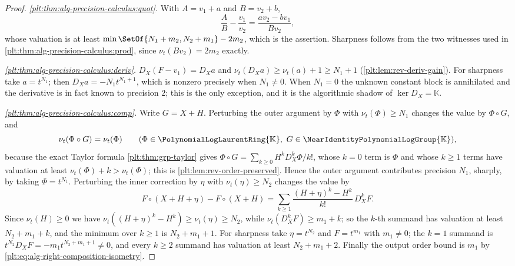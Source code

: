 \documentclass[11pt,oneside]{article}
\theoremstyle{plain}
\theoremstyle{definition}
\theoremstyle{remark}
\newcommand{\K}{\mathbb{K}}
\newcommand{\PLlau}{\PolynomialLogLaurentRing{\K}}       %
\newcommand{\Gnear}{\NearIdentityPolynomialLogGroup{\K}} %
\newcommand{\ordt}{\nu_{t}}                              %
\newcommand{\DX}{D_{X}}                                  %
\newcommand{\compose}{\mathbin{\circ}}
\begin{document}
\begin{proof}
\emph{\ref{plt:thm:alg-precision-calculus:quot}.}
With \(A=v_1+a\) and \(B=v_2+b\),
\[
 \frac AB-\frac{v_1}{v_2}
 =\frac{av_2-bv_1}{Bv_2},
\]
whose valuation is at least
\(\min\SetOf{N_1+m_2,N_2+m_1}-2m_2\), which is the assertion.  Sharpness follows
from the two witnesses used in \ref{plt:thm:alg-precision-calculus:prod},
since \(\ordt(Bv_2)=2m_2\) exactly.

\emph{\ref{plt:thm:alg-precision-calculus:deriv}.}
\(\DX(F-v_1)=\DX a\) and \(\ordt(\DX a)\ge\ordt(a)+1\ge N_1+1\)
(\cref{plt:lem:rev-deriv-gain}).  For sharpness take \(a=t^{N_1}\); then
\(\DX a=-N_1t^{N_1+1}\), which is nonzero precisely when \(N_1\ne0\).  When
\(N_1=0\) the unknown constant block is annihilated and the derivative is in
fact known to precision \(2\); this is the only exception, and it is the
algorithmic shadow of \(\ker\DX=\K\).

\emph{\ref{plt:thm:alg-precision-calculus:comp}.}
Write \(G=X+H\).  Perturbing the outer argument by \(\Phi\) with
\(\ordt(\Phi)\ge N_1\) changes the value by \(\Phi\compose G\), and
\begin{equation}\label{plt:eq:alg-right-composition-isometry}
 \ordt(\Phi\compose G)=\ordt(\Phi)
 \qquad(\Phi\in\PLlau,\ G\in\Gnear),
\end{equation}
because the exact Taylor formula \cref{plt:thm:grp-taylor} gives
\(\Phi\compose G=\sum_{k\ge0}H^k\DX^k\Phi/k!\), whose \(k=0\) term is \(\Phi\)
and whose \(k\ge1\) terms have valuation at least
\(\ordt(\Phi)+k>\ordt(\Phi)\); this is
\cref{plt:lem:rev-order-preserved}.  Hence the outer argument contributes
precision \(N_1\), sharply, by taking \(\Phi=t^{N_1}\).
Perturbing the inner correction by \(\eta\) with \(\ordt(\eta)\ge N_2\) changes
the value by
\[
 F\compose(X+H+\eta)-F\compose(X+H)
 =\sum_{k\ge1}\frac{(H+\eta)^k-H^k}{k!}\,\DX^kF .
\]
Since \(\ordt(H)\ge0\) we have \(\ordt((H+\eta)^k-H^k)\ge\ordt(\eta)\ge N_2\),
while \(\ordt(\DX^kF)\ge m_1+k\); so the \(k\)-th summand has valuation at
least \(N_2+m_1+k\), and the minimum over \(k\ge1\) is \(N_2+m_1+1\).  For
sharpness take \(\eta=t^{N_2}\) and \(F=t^{m_1}\) with \(m_1\ne0\); the
\(k=1\) summand is \(t^{N_2}\DX F=-m_1t^{N_2+m_1+1}\ne0\), and every
\(k\ge2\) summand has valuation at least \(N_2+m_1+2\).  Finally the output
order bound is \(m_1\) by \cref{plt:eq:alg-right-composition-isometry}.
\end{proof}
\end{document}
